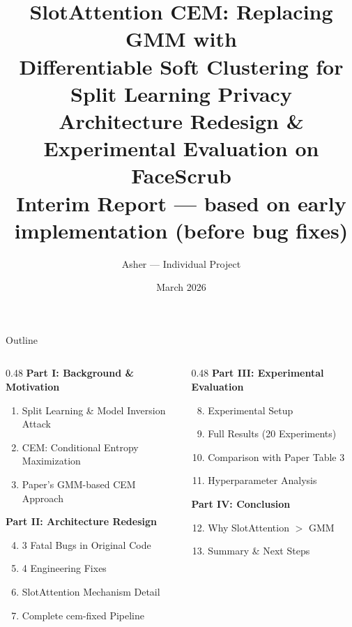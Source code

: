 \documentclass[aspectratio=169, 10pt]{beamer}
\title[SlotAttention CEM]{\textbf{SlotAttention CEM: Replacing GMM with}\\
\textbf{Differentiable Soft Clustering for Split Learning Privacy}\\[0.2cm]
{\normalsize Architecture Redesign \& Experimental Evaluation on FaceScrub}\\[0.1cm]
{\small\color{warnorg} Interim Report --- based on early implementation (before bug fixes)}}
\author{Asher --- Individual Project}
\date{March 2026}
\begin{document}
\begin{frame}
\titlepage
\end{frame}

\begin{frame}{Outline}

\begin{columns}[T]
\begin{column}{0.48\textwidth}
\textbf{Part I: Background \& Motivation}
\begin{enumerate}
    \item Split Learning \& Model Inversion Attack
    \item CEM: Conditional Entropy Maximization
    \item Paper's GMM-based CEM Approach
\end{enumerate}

\vspace{0.3cm}
\textbf{Part II: Architecture Redesign}
\begin{enumerate}\setcounter{enumi}{3}
    \item 3 Fatal Bugs in Original Code
    \item 4 Engineering Fixes
    \item SlotAttention Mechanism Detail
    \item Complete cem-fixed Pipeline
\end{enumerate}
\end{column}
\begin{column}{0.48\textwidth}
\textbf{Part III: Experimental Evaluation}
\begin{enumerate}\setcounter{enumi}{7}
    \item Experimental Setup
    \item Full Results (20 Experiments)
    \item Comparison with Paper Table 3
    \item Hyperparameter Analysis
\end{enumerate}

\vspace{0.3cm}
\textbf{Part IV: Conclusion}
\begin{enumerate}\setcounter{enumi}{11}
    \item Why SlotAttention $>$ GMM
    \item Summary \& Next Steps
\end{enumerate}
\end{column}
\end{columns}

\end{frame}
\end{document}
